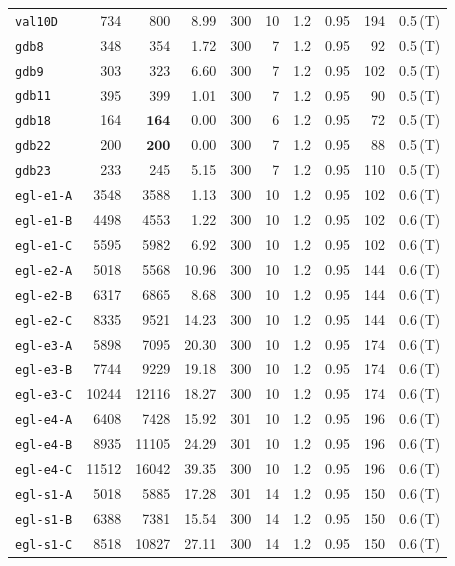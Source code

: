 \begin{longtable}{lrrrrrrrrl}
\texttt{val10D} & 734 & 800 & 8.99 & 300 & 10 & 1.2 & 0.95 & 194 & 0.5\,(T) \\
\texttt{gdb8} & 348 & 354 & 1.72 & 300 & 7 & 1.2 & 0.95 & 92 & 0.5\,(T) \\
\texttt{gdb9} & 303 & 323 & 6.60 & 300 & 7 & 1.2 & 0.95 & 102 & 0.5\,(T) \\
\texttt{gdb11} & 395 & 399 & 1.01 & 300 & 7 & 1.2 & 0.95 & 90 & 0.5\,(T) \\
\texttt{gdb18} & 164 & $\mathbf{164}$ & 0.00 & 300 & 6 & 1.2 & 0.95 & 72 & 0.5\,(T) \\
\texttt{gdb22} & 200 & $\mathbf{200}$ & 0.00 & 300 & 7 & 1.2 & 0.95 & 88 & 0.5\,(T) \\
\texttt{gdb23} & 233 & 245 & 5.15 & 300 & 7 & 1.2 & 0.95 & 110 & 0.5\,(T) \\
\texttt{egl-e1-A} & 3548 & 3588 & 1.13 & 300 & 10 & 1.2 & 0.95 & 102 & 0.6\,(T) \\
\texttt{egl-e1-B} & 4498 & 4553 & 1.22 & 300 & 10 & 1.2 & 0.95 & 102 & 0.6\,(T) \\
\texttt{egl-e1-C} & 5595 & 5982 & 6.92 & 300 & 10 & 1.2 & 0.95 & 102 & 0.6\,(T) \\
\texttt{egl-e2-A} & 5018 & 5568 & 10.96 & 300 & 10 & 1.2 & 0.95 & 144 & 0.6\,(T) \\
\texttt{egl-e2-B} & 6317 & 6865 & 8.68 & 300 & 10 & 1.2 & 0.95 & 144 & 0.6\,(T) \\
\texttt{egl-e2-C} & 8335 & 9521 & 14.23 & 300 & 10 & 1.2 & 0.95 & 144 & 0.6\,(T) \\
\texttt{egl-e3-A} & 5898 & 7095 & 20.30 & 300 & 10 & 1.2 & 0.95 & 174 & 0.6\,(T) \\
\texttt{egl-e3-B} & 7744 & 9229 & 19.18 & 300 & 10 & 1.2 & 0.95 & 174 & 0.6\,(T) \\
\texttt{egl-e3-C} & 10244 & 12116 & 18.27 & 300 & 10 & 1.2 & 0.95 & 174 & 0.6\,(T) \\
\texttt{egl-e4-A} & 6408 & 7428 & 15.92 & 301 & 10 & 1.2 & 0.95 & 196 & 0.6\,(T) \\
\texttt{egl-e4-B} & 8935 & 11105 & 24.29 & 301 & 10 & 1.2 & 0.95 & 196 & 0.6\,(T) \\
\texttt{egl-e4-C} & 11512 & 16042 & 39.35 & 300 & 10 & 1.2 & 0.95 & 196 & 0.6\,(T) \\
\texttt{egl-s1-A} & 5018 & 5885 & 17.28 & 301 & 14 & 1.2 & 0.95 & 150 & 0.6\,(T) \\
\texttt{egl-s1-B} & 6388 & 7381 & 15.54 & 300 & 14 & 1.2 & 0.95 & 150 & 0.6\,(T) \\
\texttt{egl-s1-C} & 8518 & 10827 & 27.11 & 300 & 14 & 1.2 & 0.95 & 150 & 0.6\,(T) \\

\end{longtable}

